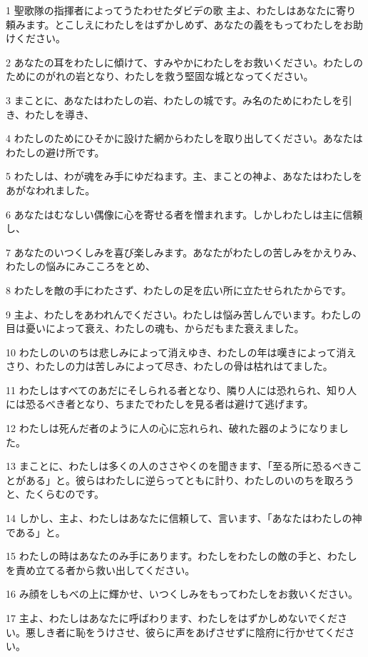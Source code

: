 \par 1 聖歌隊の指揮者によってうたわせたダビデの歌 主よ、わたしはあなたに寄り頼みます。とこしえにわたしをはずかしめず、あなたの義をもってわたしをお助けください。
\par 2 あなたの耳をわたしに傾けて、すみやかにわたしをお救いください。わたしのためにのがれの岩となり、わたしを救う堅固な城となってください。
\par 3 まことに、あなたはわたしの岩、わたしの城です。み名のためにわたしを引き、わたしを導き、
\par 4 わたしのためにひそかに設けた網からわたしを取り出してください。あなたはわたしの避け所です。
\par 5 わたしは、わが魂をみ手にゆだねます。主、まことの神よ、あなたはわたしをあがなわれました。
\par 6 あなたはむなしい偶像に心を寄せる者を憎まれます。しかしわたしは主に信頼し、
\par 7 あなたのいつくしみを喜び楽しみます。あなたがわたしの苦しみをかえりみ、わたしの悩みにみこころをとめ、
\par 8 わたしを敵の手にわたさず、わたしの足を広い所に立たせられたからです。
\par 9 主よ、わたしをあわれんでください。わたしは悩み苦しんでいます。わたしの目は憂いによって衰え、わたしの魂も、からだもまた衰えました。
\par 10 わたしのいのちは悲しみによって消えゆき、わたしの年は嘆きによって消えさり、わたしの力は苦しみによって尽き、わたしの骨は枯れはてました。
\par 11 わたしはすべてのあだにそしられる者となり、隣り人には恐れられ、知り人には恐るべき者となり、ちまたでわたしを見る者は避けて逃げます。
\par 12 わたしは死んだ者のように人の心に忘れられ、破れた器のようになりました。
\par 13 まことに、わたしは多くの人のささやくのを聞きます、「至る所に恐るべきことがある」と。彼らはわたしに逆らってともに計り、わたしのいのちを取ろうと、たくらむのです。
\par 14 しかし、主よ、わたしはあなたに信頼して、言います、「あなたはわたしの神である」と。
\par 15 わたしの時はあなたのみ手にあります。わたしをわたしの敵の手と、わたしを責め立てる者から救い出してください。
\par 16 み顔をしもべの上に輝かせ、いつくしみをもってわたしをお救いください。
\par 17 主よ、わたしはあなたに呼ばわります、わたしをはずかしめないでください。悪しき者に恥をうけさせ、彼らに声をあげさせずに陰府に行かせてください。

